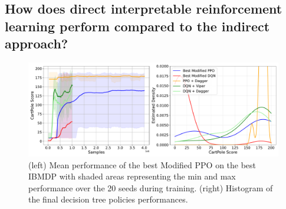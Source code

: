 \subsection{How does direct interpretable reinforcement learning perform compared to the indirect approach?}

\begin{figure}
    \centering
    \includegraphics[width=1\textwidth]{images/images_part1/ppo_tree_study.pdf}
    \caption{(left) Mean performance of the best Modified PPO on the best IBMDP with shaded areas representing the min and max performance over the 20 seeds during training. (right) Histogram of the final decision tree policies performances.}
\end{figure}


